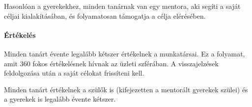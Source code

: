 Hasonlóan a gyerekekhez, minden tanárnak van egy mentora, aki segíti a saját céljai kialakításában, és folyamatosan támogatja a célja elérésében.

\paragraph{Értékelés}

Minden tanárt évente legalább kétszer értékelnek a munkatársai. Ez a folyamat, amit 360 fokos értékelésnek hívnak az üzleti szférában. A visszajelzések feldolgozása után a saját célokat frissíteni kell.

Minden tanárt értékelnek a szülők is (kifejezetten a mentorált gyerekek szülei) és a gyerekek is legalább évente kétszer.

